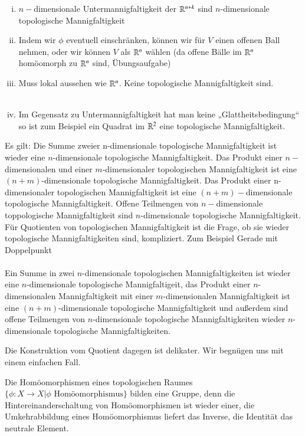 \documentclass[a4paper,10pt]{scrartcl}
\begin{document}
\begin{note*}
 \begin{enumerate}[(i)]
  \item $n-$dimensionale Untermannigfaltigkeit der $\mathbb{R}^{n+k}$ sind $n$-dimensionale topologische Mannigfaltigkeit
  \item Indem wir $\phi$ eventuell einschränken, können wir für $V$ einen offenen Ball nehmen, oder wir können $V$ als $\mathbb{R}^n$ wählen (da offene Bälle im $\mathbb{R}^n$ homöomorph zu $\mathbb{R}^n$ sind, Übungsaufgabe)
  \item Muss lokal aussehen wie $\mathbb{R}^n$. Keine topologische Mannigfaltigkeit sind.\\
\fixme[fig32]\\
\item Im Gegensatz zu Untermannigfaltigkeit hat man keine „Glattheitsbedingung“ so ist zum Beispiel ein Quadrat im $\mathbb{R}^2$ eine topologische Mannigfaltigkeit.
 \end{enumerate}
\end{note*}
Es gilt: Die Summe zweier n-dimensionale topologische Mannigfaltigkeit ist wieder eine $n$-dimensionale topologische Mannigfaltigkeit. Das Produkt einer $n-$dimensionalen und einer $m$-dimensionaler topologischen Mannigfaltigkeit ist eine $(n+m)$-dimensionale topologische Mannigfaltigkeit. Das Produkt einer n-dimensionaler topologischen Mannigfaltigkeit ist eine $(n+m)-$dimensionale topologische Mannigfaltigkeit. Offene Teilmengen von $n-$dimensionale toppologische Mannigfaltigkeit sind $n$-dimensionale topologische Mannigfaltigkeit. Für Quotienten von topologischen Mannigfaltigkeit ist die Frage, ob sie wieder topologische Mannigfaltigkeiten sind, kompliziert.
Zum Beispiel Gerade mit Doppelpunkt\\
\fixme[fig33]\\
Ein Summe in zwei $n$-dimensionale topologischen Mannigfaltigkeiten ist wieder eine $n$-dimensionale topologische Mannigfaltigeit, das Produkt einer $n$-dimensionalen Mannigfaltigkeit mit einer $m$-dimensionalen Mannigfaltigkeit ist eine $(n+ m)$-dimensionale topologische Mannigfaltigkeit und außerdem sind offene Teilmengen von $n$-dimensionale topologische Mannigfaltigkeiten wieder $n$-dimensionale topologische Mannigfaltigkeiten.  

Die Konstruktion vom Quotient dagegen ist delikater. Wir begnügen uns mit einem einfachen Fall.

Die Homöomorphismen eines topologischen Raumes $\{\phi: X\to X|\phi \text{ Homöomorphismus}\}$ bilden eine Gruppe, denn die Hintereinanderschaltung von Homöomorphismen ist wieder einer, die Umkehrabbildung eines Homöomorphismus liefert das Inverse, die Identität das neutrale Element.
\end{document}
